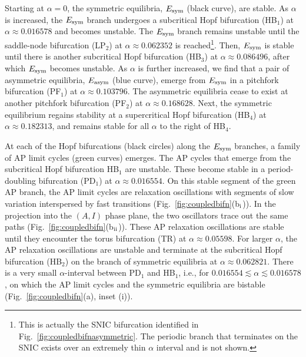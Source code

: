 \documentclass[10pt,onecolumn]{article}
\theoremstyle{plain}
\begin{document}
Starting at $\alpha = 0$, the symmetric equilibria, $E_{\rm sym}$ (black curve), are stable. As $\alpha$ is increased, the $E_{\rm sym}$ branch undergoes a subcritical Hopf bifurcation (HB$_1$) at $\alpha \approx 0.016578$ and becomes unstable. The $E_{\rm sym}$ branch remains unstable until the saddle-node bifurcation (LP$_2$) at $\alpha \approx 0.062352$ is reached\footnote{This is actually the SNIC bifurcation identified in Fig.~\ref{fig:coupledbifnasymmetric}. The periodic branch that terminates on the SNIC exists over an extremely thin $\alpha$ interval and is not shown.}. Then, $E_{\rm sym}$ is stable until there is another subcritical Hopf bifurcation (HB$_3$) at $\alpha \approx 0.086496$, after which $E_{\rm sym}$ becomes unstable. As $\alpha$ is further increased, we find that a pair of asymmetric equilibria, $E_{\rm asym}$ (blue curve), emerge from $E_{\rm sym}$ in a pitchfork bifurcation (PF$_1$) at $\alpha \approx 0.103796$. The asymmetric equilibria cease to exist at another pitchfork bifurcation (PF$_2$) at $\alpha \approx 0.168628$. Next, the symmetric equilibrium regains stability at a supercritical Hopf bifurcation (HB$_4$) at $\alpha \approx 0.182313$, and remains stable for all $\alpha$ to the right of HB$_4$. 

At each of the Hopf bifurcations (black circles) along the $E_{\rm sym}$ branches, a family of AP limit cycles (green curves) emerges. The AP cycles that emerge from the subcritical Hopf bifurcation HB$_1$ are unstable. These become stable in a period-doubling bifurcation (PD$_1$) at $\alpha \approx 0.016554$. On this stable segment of the green AP branch, the AP limit cycles are relaxation oscillations with segments of slow variation interspersed by fast transitions (Fig.~\ref{fig:coupledbifn}(b$_{\rm i}$)). In the projection into the $(A,I)$ phase plane, the two oscillators trace out the same paths (Fig.~\ref{fig:coupledbifn}(b$_{\rm ii}$)). These AP relaxation oscillations are stable until they encounter the torus bifurcation (TR) at $\alpha \approx 0.05598$. For larger $\alpha$, the AP relaxation oscillations are unstable and terminate at the subcritical Hopf bifurcation (HB$_2$) on the branch of symmetric equilibria at $\alpha \approx 0.062821$. There is a very small $\alpha$-interval between PD$_1$ and HB$_1$, i.e., for $0.016554 \lesssim \alpha \lesssim 0.016578$, on which the AP limit cycles and the symmetric equilibria are bistable (Fig.~\ref{fig:coupledbifn}(a), inset (i)).
\end{document}
